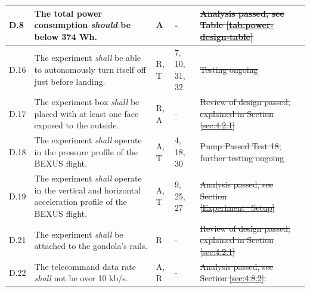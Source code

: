 \documentclass[a4paper,12pt,oneside]{article} %
\providecommand{\DIFaddtex}[1]{{\protect\color{blue}\uwave{#1}}} %
\providecommand{\DIFdeltex}[1]{{\protect\color{red}\sout{#1}}}                      %
\providecommand{\DIFaddbegin}{} %
\providecommand{\DIFaddend}{} %
\providecommand{\DIFdelbegin}{} %
\providecommand{\DIFdelend}{} %
\providecommand{\DIFadd}[1]{\texorpdfstring{\DIFaddtex{#1}}{#1}} %
\providecommand{\DIFdel}[1]{\texorpdfstring{\DIFdeltex{#1}}{}} %
\newcommand{\DIFscaledelfig}{0.5}
\newlength{\DIFdelgraphicswidth} %
\newlength{\DIFdelgraphicsheight} %
\newcommand{\DIFaddincludegraphics}[2][]{{\color{blue}\fbox{\DIFOincludegraphics[#1]{#2}}}} %
\newcommand{\DIFdelincludegraphics}[2][]{%
\sbox{\DIFdelgraphicsbox}{\DIFOincludegraphics[#1]{#2}}%
\settoboxwidth{\DIFdelgraphicswidth}{\DIFdelgraphicsbox} %
\settoboxtotalheight{\DIFdelgraphicsheight}{\DIFdelgraphicsbox} %
\scalebox{\DIFscaledelfig}{%
\parbox[b]{\DIFdelgraphicswidth}{\usebox{\DIFdelgraphicsbox}\\[-\baselineskip] \rule{\DIFdelgraphicswidth}{0em}}\llap{\resizebox{\DIFdelgraphicswidth}{\DIFdelgraphicsheight}{%
\setlength{\unitlength}{\DIFdelgraphicswidth}%
\begin{picture}(1,1)%
\thicklines\linethickness{2pt} %
{\color[rgb]{1,0,0}\put(0,0){\framebox(1,1){}}}%
{\color[rgb]{1,0,0}\put(0,0){\line( 1,1){1}}}%
{\color[rgb]{1,0,0}\put(0,1){\line(1,-1){1}}}%
\end{picture}%
}\hspace*{3pt}}} %
} %
\DeclareRobustCommand{\DIFaddbegin}{\DIFOaddbegin \let\includegraphics\DIFaddincludegraphics} %
\DeclareRobustCommand{\DIFaddend}{\DIFOaddend \let\includegraphics\DIFOincludegraphics} %
\DeclareRobustCommand{\DIFdelbegin}{\DIFOdelbegin \let\includegraphics\DIFdelincludegraphics} %
\DeclareRobustCommand{\DIFdelend}{\DIFOaddend \let\includegraphics\DIFOincludegraphics} %
\begin{document}
\begin{longtable}[]{|m{}| m{} |m{} |m{}|m{}|}
D.8  & The total power consumption \textit{should} be below 374 Wh.& A & - & \DIFdelbegin \DIFdel{Analysis passed, see Table \ref{tab:power-design-table} }\DIFdelend \DIFaddbegin \DIFadd{Pass }\DIFaddend \\ \hline %
D.16 & The experiment \textit{shall} be able to autonomously turn itself off just before landing.                                                                                       &       R, T      &  7, 10, 31, 32           &   \DIFdelbegin \DIFdel{Testing ongoing    }\DIFdelend \DIFaddbegin \DIFadd{Pass    }\DIFaddend \\ \hline
D.17 & The experiment box \textit{shall} be placed with at least one face exposed to the outside.                                                                                &     R, A         & -            &   \DIFdelbegin \DIFdel{Review of design passed, explained in Section \ref{sec:4.2.1}     
}\DIFdelend \DIFaddbegin \DIFadd{Pass      
}\DIFaddend \\ \hline %
D.18 & The  experiment \textit{shall} operate  in  the  pressure  profile  of  the BEXUS flight.\cite{BexusManual}                                                                              &    A, T         & 4, 18, 30 &  \DIFdelbegin \DIFdel{Pump Passed Test 18, further testing ongoing     
}\DIFdelend \DIFaddbegin \DIFadd{Pass
}\DIFaddend \\ \hline
D.19 & The  experiment \textit{shall} operate  in  the  vertical  and  horizontal  acceleration  profile  of  the BEXUS flight.\cite{BexusManual}                                                                              &    A, T         & 9, 25, 27            &   \DIFdelbegin \DIFdel{Analysis passed, see Section \ref{Experiment_Setup}    
}\DIFdelend \DIFaddbegin \DIFadd{Pass   
}\DIFaddend \\ \hline
D.21 & The experiment \textit{shall} be attached to the gondola’s rails.                                                                                &     R         & -            &  \DIFdelbegin \DIFdel{Review of design passed, explained in Section \ref{sec:4.2.1}     
}\DIFdelend \DIFaddbegin \DIFadd{Pass
}\DIFaddend \\ \hline %
D.22 & The telecommand data rate \textit{shall} not be over 10 kb/s.                                                                               &     A, R         & -            &    \DIFdelbegin \DIFdel{Analysis passed, see Section \ref{sec:4.8.2}.   
}\DIFdelend \DIFaddbegin \DIFadd{Pass
}\DIFaddend \\  \hline%


\end{longtable}
\end{document}
